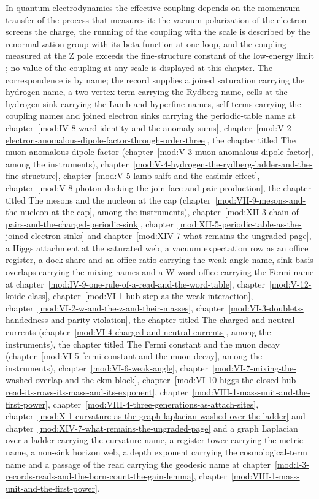 \begin{chbridge}
In quantum electrodynamics the effective coupling depends on the momentum transfer of the process that measures it: the vacuum polarization of the electron screens the charge, the running of the coupling with the scale is described by the renormalization group with its beta function at one loop, and the coupling measured at the Z pole exceeds the fine-structure constant of the low-energy limit \cite{GellMann1954,Serber1935}; no value of the coupling at any scale is displayed at this chapter. The correspondence is by name; the record supplies a joined saturation carrying the hydrogen name, a two-vertex term carrying the Rydberg name, cells at the hydrogen sink carrying the Lamb and hyperfine names, self-terms carrying the coupling names and joined electron sinks carrying the periodic-table name at chapter~\ref{mod:IV-8-ward-identity-and-the-anomaly-sums}, chapter~\ref{mod:V-2-electron-anomalous-dipole-factor-through-order-three}, the chapter titled The muon anomalous dipole factor (chapter~\ref{mod:V-3-muon-anomalous-dipole-factor}, among the instruments), chapter~\ref{mod:V-4-hydrogen-the-rydberg-ladder-and-the-fine-structure}, chapter~\ref{mod:V-5-lamb-shift-and-the-casimir-effect}, chapter~\ref{mod:V-8-photon-docking-the-join-face-and-pair-production}, the chapter titled The mesons and the nucleon at the cap (chapter~\ref{mod:VII-9-mesons-and-the-nucleon-at-the-cap}, among the instruments), chapter~\ref{mod:XII-3-chain-of-pairs-and-the-charged-periodic-sink}, chapter~\ref{mod:XII-5-periodic-table-as-the-joined-electron-sinks} and chapter~\ref{mod:XIV-7-what-remains-the-ungraded-page}, a Higgs attachment at the saturated web, a vacuum expectation row as an office register, a dock share and an office ratio carrying the weak-angle name, sink-basis overlaps carrying the mixing names and a W-word office carrying the Fermi name at chapter~\ref{mod:IV-9-one-rule-of-a-read-and-the-word-table}, chapter~\ref{mod:V-12-koide-class}, chapter~\ref{mod:VI-1-hub-step-as-the-weak-interaction}, chapter~\ref{mod:VI-2-w-and-the-z-and-their-masses}, chapter~\ref{mod:VI-3-doublets-handedness-and-parity-violation}, the chapter titled The charged and neutral currents (chapter~\ref{mod:VI-4-charged-and-neutral-currents}, among the instruments), the chapter titled The Fermi constant and the muon decay (chapter~\ref{mod:VI-5-fermi-constant-and-the-muon-decay}, among the instruments), chapter~\ref{mod:VI-6-weak-angle}, chapter~\ref{mod:VI-7-mixing-the-washed-overlap-and-the-ckm-block}, chapter~\ref{mod:VI-10-higgs-the-closed-hub-read-its-rows-its-mass-and-its-exponent}, chapter~\ref{mod:VIII-1-mass-unit-and-the-first-power}, chapter~\ref{mod:VIII-4-three-generations-as-attach-sites}, chapter~\ref{mod:X-1-curvature-as-the-graph-laplacian-washed-over-the-ladder} and chapter~\ref{mod:XIV-7-what-remains-the-ungraded-page} and a graph Laplacian over a ladder carrying the curvature name, a register tower carrying the metric name, a non-sink horizon web, a depth exponent carrying the cosmological-term name and a passage of the read carrying the geodesic name at chapter~\ref{mod:I-3-records-reads-and-the-born-count-the-gain-lemma}, chapter~\ref{mod:VIII-1-mass-unit-and-the-first-power}, 
\end{chbridge}
